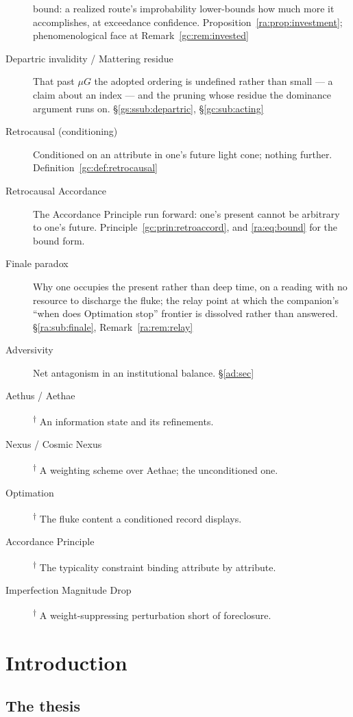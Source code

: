 \documentclass[11pt]{article}
\numberwithin{equation}{section}
\theoremstyle{plain}
\theoremstyle{definition}
\theoremstyle{remark}
\begin{document}
\begin{description}
bound: a realized route's improbability lower-bounds how much more it
accomplishes, at exceedance confidence. Proposition~\ref{ra:prop:investment};
phenomenological face at Remark~\ref{gc:rem:invested}
\item[Departric invalidity / Mattering residue] That past $\mu G$ the
adopted ordering is undefined rather than small --- a claim about an
index --- and the pruning whose residue the dominance argument runs on.
\S\ref{gs:ssub:departric}, \S\ref{gc:sub:acting}
\item[Retrocausal (conditioning)] Conditioned on an attribute in one's
future light cone; nothing further. Definition~\ref{gc:def:retrocausal}
\item[Retrocausal Accordance] The Accordance Principle run forward: one's
present cannot be arbitrary to one's future.
Principle~\ref{gc:prin:retroaccord}, and \eqref{ra:eq:bound} for the
bound form.
\item[Finale paradox] Why one occupies the present rather than deep time,
on a reading with no resource to discharge the fluke; the relay point at
which the companion's ``when does Optimation stop'' frontier is
dissolved rather than answered. \S\ref{ra:sub:finale},
Remark~\ref{ra:rem:relay}
\item[Adversivity] Net antagonism in an institutional balance.
\S\ref{ad:sec}
\item[Aethus / Aethae]\textsuperscript{$\dagger$} An information state
and its refinements.
\item[Nexus / Cosmic Nexus]\textsuperscript{$\dagger$} A weighting scheme
over Aethae; the unconditioned one.
\item[Optimation]\textsuperscript{$\dagger$} The fluke content a
conditioned record displays.
\item[Accordance Principle]\textsuperscript{$\dagger$} The typicality
constraint binding attribute by attribute.
\item[Imperfection Magnitude Drop]\textsuperscript{$\dagger$} A
weight-suppressing perturbation short of foreclosure.
\end{description}


\section{Introduction}\label{intro:sec}

\subsection{The thesis}\label{intro:sub:thesis}
\end{document}
